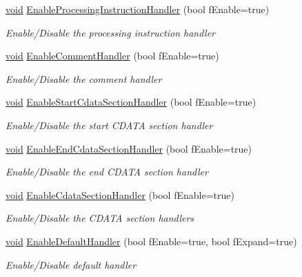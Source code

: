 \begin{DoxyCompactItemize}
\hyperlink{_cpclient_8h_a6464f7480a0fd0ee170cba12b2c0497f}{void} \hyperlink{class_c_expat_impl_ad645eca4eb59c0faa6425a20f6a05595}{\-Enable\-Processing\-Instruction\-Handler} (bool f\-Enable=true)
\begin{DoxyCompactList}\small\item\em \-Enable/\-Disable the processing instruction handler \end{DoxyCompactList}\item 
\hyperlink{_cpclient_8h_a6464f7480a0fd0ee170cba12b2c0497f}{void} \hyperlink{class_c_expat_impl_a552c6281c12de7a74e17df3faf38723b}{\-Enable\-Comment\-Handler} (bool f\-Enable=true)
\begin{DoxyCompactList}\small\item\em \-Enable/\-Disable the comment handler \end{DoxyCompactList}\item 
\hyperlink{_cpclient_8h_a6464f7480a0fd0ee170cba12b2c0497f}{void} \hyperlink{class_c_expat_impl_a27ad6538ae5e773fc2d6af0ff8441582}{\-Enable\-Start\-Cdata\-Section\-Handler} (bool f\-Enable=true)
\begin{DoxyCompactList}\small\item\em \-Enable/\-Disable the start \-C\-D\-A\-T\-A section handler \end{DoxyCompactList}\item 
\hyperlink{_cpclient_8h_a6464f7480a0fd0ee170cba12b2c0497f}{void} \hyperlink{class_c_expat_impl_a3390e7ef5fc411b0d76da2cc3528231d}{\-Enable\-End\-Cdata\-Section\-Handler} (bool f\-Enable=true)
\begin{DoxyCompactList}\small\item\em \-Enable/\-Disable the end \-C\-D\-A\-T\-A section handler \end{DoxyCompactList}\item 
\hyperlink{_cpclient_8h_a6464f7480a0fd0ee170cba12b2c0497f}{void} \hyperlink{class_c_expat_impl_ad0b0fa3d2c7604d0af6f8b4662d17c38}{\-Enable\-Cdata\-Section\-Handler} (bool f\-Enable=true)
\begin{DoxyCompactList}\small\item\em \-Enable/\-Disable the \-C\-D\-A\-T\-A section handlers \end{DoxyCompactList}\item 
\hyperlink{_cpclient_8h_a6464f7480a0fd0ee170cba12b2c0497f}{void} \hyperlink{class_c_expat_impl_a79ccb0e194a01a82e67f0d75a05ff4dc}{\-Enable\-Default\-Handler} (bool f\-Enable=true, bool f\-Expand=true)
\begin{DoxyCompactList}\small\item\em \-Enable/\-Disable default handler \end{DoxyCompactList}\item 

\end{DoxyCompactItemize}
